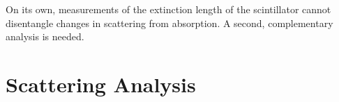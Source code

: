 On its own, measurements of the extinction length of the scintillator cannot disentangle changes in scattering from absorption. A second, complementary analysis is needed.



\section{Scattering Analysis}\label{sec:scattering_analysis}
